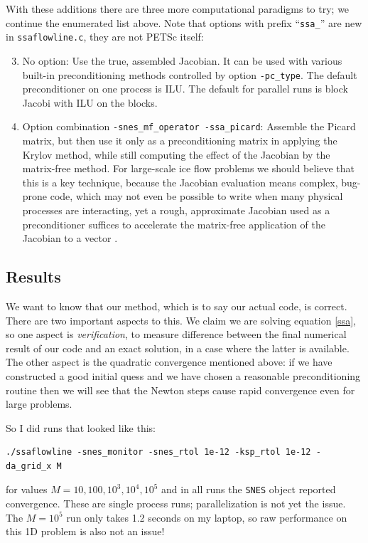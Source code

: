\documentclass[11pt,final,reqno]{amsart}
\begin{document}
With these additions there are three more computational paradigms to try; we continue the enumerated list above.  Note that options with prefix ``\texttt{ssa\_}'' are new in \texttt{ssaflowline.c}, they are not  PETSc itself:
\begin{enumerate}
\setcounter{enumi}{2}
\item No option:  Use the true, assembled Jacobian.  It can be used with various built-in preconditioning methods controlled by option \texttt{-pc\_type}.  The default preconditioner on one process is ILU.  The default for parallel runs is block Jacobi with ILU on the blocks.
\item Option combination \texttt{-snes\_mf\_operator -ssa\_picard}:  Assemble the Picard matrix, but then use it only as a preconditioning matrix in applying the Krylov method, while still computing the effect of the Jacobian by the matrix-free method.  For large-scale ice flow problems we should believe that this is a key technique, because the Jacobian evaluation means complex, bug-prone code, which may not even be possible to write when many physical processes are interacting, yet a rough, approximate Jacobian used as a preconditioner suffices to accelerate the matrix-free application of the Jacobian to a vector \cite{KnollKeyes2004}.
\end{enumerate}


\subsection*{Results}  We want to know that our method, which is to say our actual code, is correct.  There are two important aspects to this.  We claim we are solving equation \eqref{ssa}, so one aspect is \emph{verification}, to measure difference between the final numerical result of our code and an exact solution, in a case where the latter is available.  The other aspect is the quadratic convergence mentioned above: if we have constructed a good initial quess and we have chosen a reasonable preconditioning routine then we will see that the Newton steps cause rapid convergence even for large problems.

So I did runs that looked like this:
\begin{Verbatim}
./ssaflowline -snes_monitor -snes_rtol 1e-12 -ksp_rtol 1e-12 -da_grid_x M
\end{Verbatim}
for values $M=10,100,10^3,10^4,10^5$ and in all runs the \texttt{SNES} object reported convergence.  These are single process runs; parallelization is not yet the issue.  The $M=10^5$ run only takes 1.2 seconds on my laptop, so raw performance on this 1D problem is also not an issue!
\end{document}
